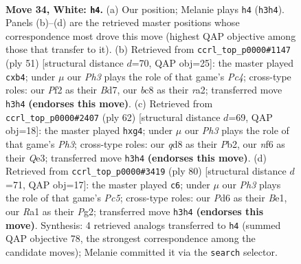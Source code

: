 \documentclass[11pt]{article}
\begin{document}
\clearpage

\begin{figure}[p]\centering
\begin{subfigure}{0.46\textwidth}\centering
\resizebox{\linewidth}{!}{%
\newchessgame
\chessboard[
  setfen={1nbq4/5p1k/1p1P1n2/4Q2p/p1P3p1/B5PP/P4P2/R5K1 w - - 0 34},
  showmover=false,
  pgfstyle=straightmove, color=movearrow, markmove={h3-h4}
]}
\caption{}
\end{subfigure}\hfill
\begin{subfigure}{0.46\textwidth}\centering
\resizebox{\linewidth}{!}{%
\newchessgame
\chessboard[
  setfen={5rk1/3b1p2/3p1q1p/2pP2p1/1P2P3/5NP1/R1Q2PP1/6K1 b - - 0 26},
  showmover=false,
  pgfstyle=straightmove, color=movearrow, markmove={c5-b4}
]}
\caption{}
\end{subfigure}
\\[4pt]
\begin{subfigure}{0.46\textwidth}\centering
\resizebox{\linewidth}{!}{%
\newchessgame
\chessboard[
  setfen={7r/4kpp1/p2p4/P1p1pP2/N1P1P1nq/4Q2P/1P4K1/6R1 w - - 0 32},
  showmover=false,
  pgfstyle=straightmove, color=movearrow, markmove={h3-g4}
]}
\caption{}
\end{subfigure}\hfill
\begin{subfigure}{0.46\textwidth}\centering
\resizebox{\linewidth}{!}{%
\newchessgame
\chessboard[
  setfen={1q4k1/5p2/3ppnpb/p1P4p/3P1P2/P2B1Q1P/6P1/4B2K w - - 0 41},
  showmover=false,
  pgfstyle=straightmove, color=movearrow, markmove={c5-c6}
]}
\caption{}
\end{subfigure}
\caption{\textbf{Move 34, White: \texttt{h4}.} (a) Our position; Melanie plays \texttt{h4} (\texttt{h3h4}). Panels (b)--(d) are the retrieved master positions whose correspondence most drove this move (highest QAP objective among those that transfer to it). (b) Retrieved from \texttt{ccrl\_top\_p0000\#1147} (ply 51) [structural distance $d$=70, QAP obj=25]: the master played \texttt{cxb4}; under $\mu$ our \emph{Ph3} plays the role of that game's \emph{Pc4}; cross-type roles: our \emph{P}f2 as their \emph{B}d7, our \emph{b}c8 as their \emph{r}a2; transferred move \texttt{h3h4} \textbf{(endorses this move)}. (c) Retrieved from \texttt{ccrl\_top\_p0000\#2407} (ply 62) [structural distance $d$=69, QAP obj=18]: the master played \texttt{hxg4}; under $\mu$ our \emph{Ph3} plays the role of that game's \emph{Ph3}; cross-type roles: our \emph{q}d8 as their \emph{P}b2, our \emph{n}f6 as their \emph{Q}e3; transferred move \texttt{h3h4} \textbf{(endorses this move)}. (d) Retrieved from \texttt{ccrl\_top\_p0000\#3419} (ply 80) [structural distance $d$=71, QAP obj=17]: the master played \texttt{c6}; under $\mu$ our \emph{Ph3} plays the role of that game's \emph{Pc5}; cross-type roles: our \emph{P}d6 as their \emph{B}e1, our \emph{R}a1 as their \emph{P}g2; transferred move \texttt{h3h4} \textbf{(endorses this move)}. Synthesis: 4 retrieved analogs transferred to \texttt{h4} (summed QAP objective 78, the strongest correspondence among the candidate moves); Melanie committed it via the \texttt{search} selector.}
\label{fig:thought-m66}
\end{figure}
\end{document}
